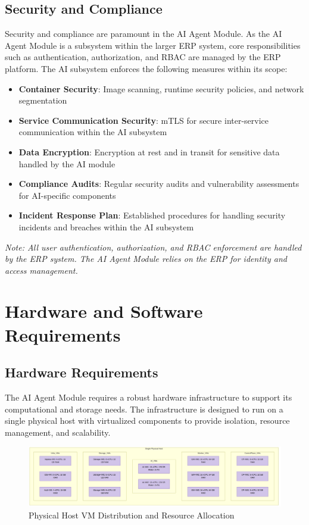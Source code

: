 \documentclass[12pt]{report}
\begin{document}
\section{Security and Compliance}
Security and compliance are paramount in the AI Agent Module. As the AI Agent Module is a subsystem within the larger ERP system, core responsibilities such as authentication, authorization, and RBAC are managed by the ERP platform. The AI subsystem enforces the following measures within its scope:
\begin{itemize}
    \item \textbf{Container Security}: Image scanning, runtime security policies, and network segmentation
    \item \textbf{Service Communication Security}: mTLS for secure inter-service communication within the AI subsystem
    \item \textbf{Data Encryption}: Encryption at rest and in transit for sensitive data handled by the AI module
    \item \textbf{Compliance Audits}: Regular security audits and vulnerability assessments for AI-specific components
    \item \textbf{Incident Response Plan}: Established procedures for handling security incidents and breaches within the AI subsystem
\end{itemize}
\textit{Note: All user authentication, authorization, and RBAC enforcement are handled by the ERP system. The AI Agent Module relies on the ERP for identity and access management.}

\chapter{Hardware and Software Requirements}
\section{Hardware Requirements}
The AI Agent Module requires a robust hardware infrastructure to support its computational and storage needs. The infrastructure is designed to run on a single physical host with virtualized components to provide isolation, resource management, and scalability.

\begin{figure}[htbp]
\centering
\includegraphics[width=\textwidth,height=0.8\textheight,keepaspectratio]{../../pics/Infra.png}
\caption{Physical Host VM Distribution and Resource Allocation}
\label{fig:server-architecture}
\end{figure}
\end{document}
